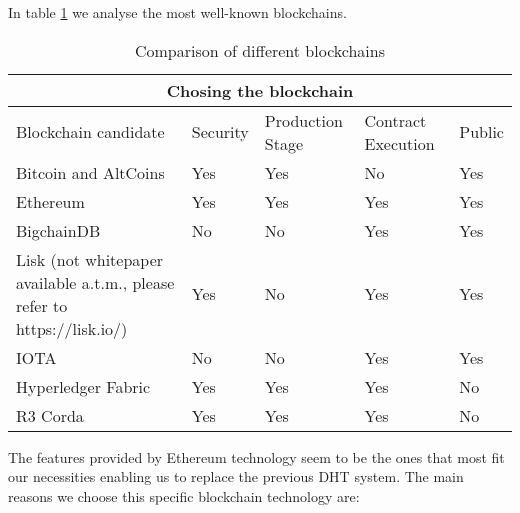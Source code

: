 In table \ref{Table:1} we analyse the most well-known blockchains.

\begin{table}[h!]
\centering
\caption{Comparison of different blockchains}
\label{Table:1}
\begin{tabular}{ |p{7cm}|p{2cm}|p{2cm}|p{2cm}|p{2cm}|  }
\hline
\multicolumn{5}{|c|}{Chosing the blockchain} \\
\hline
Blockchain candidate & Security & Production Stage & Contract Execution & Public \\
\hline
Bitcoin and AltCoins \cite{nakamoto_bitcoin_2008} & Yes & Yes & No & Yes \\
\hline
Ethereum \cite{wood_ethereum_2014} & Yes & Yes & Yes & Yes \\
\hline
BigchainDB \cite{bigchaindb_whitepaper} & No \cite{_bigchaindb_bullshit} \ & No & Yes & Yes \\
\hline
Lisk (not whitepaper available a.t.m., please refer to https://lisk.io/) & Yes & No \cite{lisk_problems} & Yes & Yes \\
\hline
IOTA \cite{iota_whitepaper}& No \cite{iota_problems} & No & Yes & Yes \\
\hline
Hyperledger Fabric \cite{martindale_fabric:_2017}& Yes & Yes & Yes & No \\
\hline
R3 Corda \cite{corda_whitepaper}& Yes & Yes & Yes & No \\
\hline
\end{tabular}
\end{table}

\FloatBarrier
The features provided by Ethereum technology seem to be the ones that most fit our necessities enabling us to replace the previous DHT system. The main reasons we choose this specific blockchain technology are:




